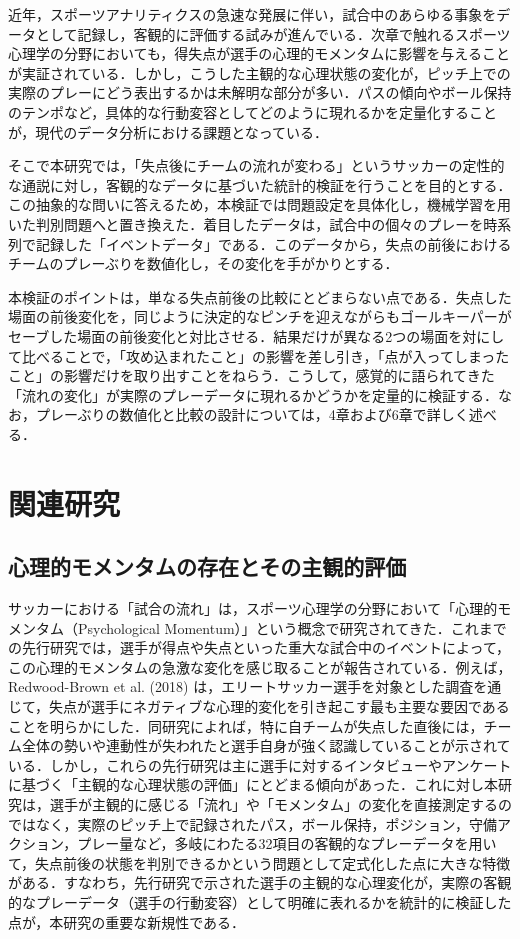 \documentclass[11pt]{ujarticle} %
\begin{document}
近年，スポーツアナリティクスの急速な発展に伴い，試合中のあらゆる事象をデータとして記録し，客観的に評価する試みが進んでいる．次章で触れるスポーツ心理学の分野においても，得失点が選手の心理的モメンタムに影響を与えることが実証されている．しかし，こうした主観的な心理状態の変化が，ピッチ上での実際のプレーにどう表出するかは未解明な部分が多い．パスの傾向やボール保持のテンポなど，具体的な行動変容としてどのように現れるかを定量化することが，現代のデータ分析における課題となっている．

そこで本研究では，「失点後にチームの流れが変わる」というサッカーの定性的な通説に対し，客観的なデータに基づいた統計的検証を行うことを目的とする．この抽象的な問いに答えるため，本検証では問題設定を具体化し，機械学習を用いた判別問題へと置き換えた．着目したデータは，試合中の個々のプレーを時系列で記録した「イベントデータ」である．このデータから，失点の前後におけるチームのプレーぶりを数値化し，その変化を手がかりとする．

本検証のポイントは，単なる失点前後の比較にとどまらない点である．失点した場面の前後変化を，同じように決定的なピンチを迎えながらもゴールキーパーがセーブした場面の前後変化と対比させる．結果だけが異なる2つの場面を対にして比べることで，「攻め込まれたこと」の影響を差し引き，「点が入ってしまったこと」の影響だけを取り出すことをねらう．こうして，感覚的に語られてきた「流れの変化」が実際のプレーデータに現れるかどうかを定量的に検証する．なお，プレーぶりの数値化と比較の設計については，4章および6章で詳しく述べる．

\section{関連研究}

\subsection{心理的モメンタムの存在とその主観的評価}
サッカーにおける「試合の流れ」は，スポーツ心理学の分野において「心理的モメンタム（Psychological Momentum）」という概念で研究されてきた．これまでの先行研究では，選手が得点や失点といった重大な試合中のイベントによって，この心理的モメンタムの急激な変化を感じ取ることが報告されている．例えば，Redwood-Brown et al. (2018)\cite{ref:redwood} は，エリートサッカー選手を対象とした調査を通じて，失点が選手にネガティブな心理的変化を引き起こす最も主要な要因であることを明らかにした．同研究によれば，特に自チームが失点した直後には，チーム全体の勢いや連動性が失われたと選手自身が強く認識していることが示されている．しかし，これらの先行研究は主に選手に対するインタビューやアンケートに基づく「主観的な心理状態の評価」にとどまる傾向があった．これに対し本研究は，選手が主観的に感じる「流れ」や「モメンタム」の変化を直接測定するのではなく，実際のピッチ上で記録されたパス，ボール保持，ポジション，守備アクション，プレー量など，多岐にわたる32項目の客観的なプレーデータを用いて，失点前後の状態を判別できるかという問題として定式化した点に大きな特徴がある．すなわち，先行研究で示された選手の主観的な心理変化が，実際の客観的なプレーデータ（選手の行動変容）として明確に表れるかを統計的に検証した点が，本研究の重要な新規性である．
\end{document}

